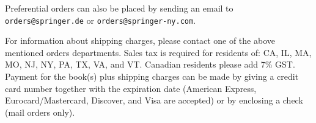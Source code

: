\documentclass[runningheads]{llncs}
\begin{document}
\noindent Preferential orders can also be placed by sending an email
to\\

\vspace{-3mm}
\indent            \verb+orders@springer.de+
                   or \verb+orders@springer-ny.com+.\\
\vspace{-3mm}

\noindent For information about shipping charges, please
contact one of the above mentioned orders departments.
Sales tax is required for residents of: CA, IL, MA, MO, NJ, NY, PA, TX,
VA, and VT. Canadian residents please add 7\% GST.
Payment for the book(s) plus shipping charges can be made by giving a
credit card number together with the expiration date (American Express,
Eurocard/Master\-card, Discover, and Visa are accepted) or by enclosing
a check (mail orders only).
\end{document}
